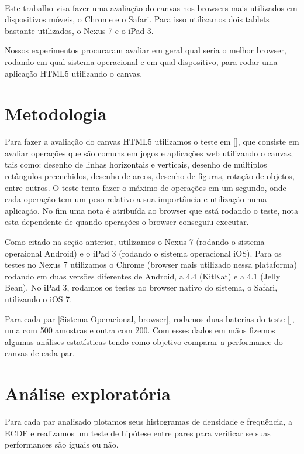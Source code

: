\documentclass[11pt,a4paper]{article}
\begin{document}
\paragraph{}
Este trabalho visa fazer uma avaliação do canvas nos browsers mais utilizados em dispositivos móveis, o Chrome e o
Safari. Para isso utilizamos dois tablets bastante utilizados, o Nexus 7 e o iPad 3.

Nossos experimentos procuraram avaliar em geral qual seria o melhor browser, rodando em qual sistema operacional e
em qual dispositivo, para rodar uma aplicação HTML5 utilizando o canvas.

\section{Metodologia}
Para fazer a avaliação do canvas HTML5 utilizamos o teste em [], que consiste em avaliar operações que são comuns em
jogos e aplicações web utilizando o canvas, tais como: desenho de linhas horizontais e verticais, desenho de múltiplos
retângulos preenchidos, desenho de arcos, desenho de figuras, rotação de objetos, entre outros. O teste tenta fazer
o máximo de operações em um segundo, onde cada operação tem um peso relativo a sua importância e utilização numa
aplicação. No fim uma nota é atribuída ao browser que está rodando o teste, nota esta dependente de quando operações o
browser conseguiu executar.

Como citado na seção anterior, utilizamos o Nexus 7 (rodando o sistema operaional Android) e o iPad 3 (rodando o sistema
operacional iOS). Para os testes no Nexus 7 utilizamos o Chrome (browser mais utilizado nessa plataforma) rodando em
duas versões diferentes de Android, a 4.4 (KitKat) e a 4.1 (Jelly Bean). No iPad 3, rodamos os testes no browser nativo
do sistema, o Safari, utilizando o iOS 7.

Para cada par [Sistema Operacional, browser], rodamos duas baterias do teste [], uma com 500 amostras e outra com 200.
Com esses dados em mãos fizemos algumas análises estatísticas tendo como objetivo comparar a performance do canvas de
cada par.

\section{Análise exploratória}\label{analise exploratoria}

Para cada par analisado plotamos seus histogramas de densidade e frequência, a ECDF e realizamos um teste de hipótese
entre pares para verificar se suas performances são iguais ou não.
\end{document}
